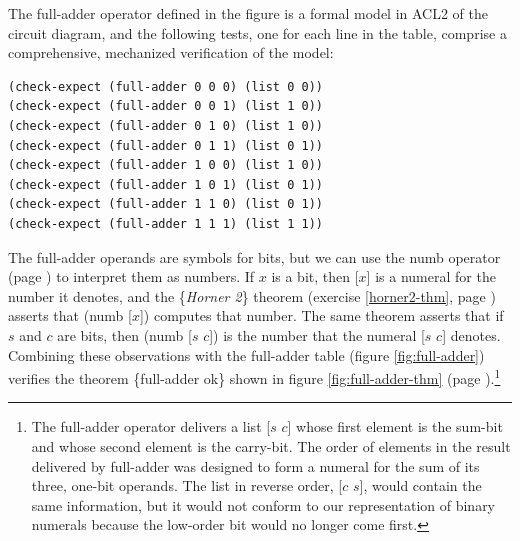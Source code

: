 The \textsf{full-adder} operator defined in the figure
is a formal model in ACL2 of the circuit diagram,
and the following tests, one for each line in the table,
comprise a comprehensive, mechanized verification of
the model:

\label{full-adder-model-check}
\begin{code}
\begin{verbatim}
(check-expect (full-adder 0 0 0) (list 0 0))
(check-expect (full-adder 0 0 1) (list 1 0))
(check-expect (full-adder 0 1 0) (list 1 0))
(check-expect (full-adder 0 1 1) (list 0 1))
(check-expect (full-adder 1 0 0) (list 1 0))
(check-expect (full-adder 1 0 1) (list 0 1))
(check-expect (full-adder 1 1 0) (list 0 1))
(check-expect (full-adder 1 1 1) (list 1 1))
\end{verbatim}
\end{code}

The \textsf{full-adder} operands
are symbols for bits, but we can use the \textsf{numb} operator
(page \pageref{nmb-defun})
to interpret them as numbers.
If $x$ is a bit, then \textsf{[$x$]} is a numeral for
the number it denotes, and the \{\emph{Horner 2}\} theorem
(exercise \ref{horner2-thm}, page \pageref{horner2-thm})
asserts that \textsf{(numb [$x$])} computes that number.
The same theorem asserts that if $s$ and $c$ are bits,
then \textsf{(numb [$s$ $c$])} is
the number that the numeral \textsf{[$s$ $c$]} denotes.
Combining these observations with the full-adder table
(figure \ref{fig:full-adder})
verifies the theorem \{full-adder ok\} shown in
figure \ref{fig:full-adder-thm} (page \pageref{fig:full-adder-thm}).\footnote{The
\textsf{full-adder} operator delivers a list \textsf{[$s$ $c$]} whose first
element is the sum-bit and whose second element is the carry-bit.
The order of elements in the result delivered by \textsf{full-adder} was designed
to form a numeral for the sum of its three, one-bit operands.
The list in reverse order, \textsf{[$c$ $s$]},
would contain the same information,
but it would not conform to our representation of binary numerals
because the low-order bit would no longer come first.}

